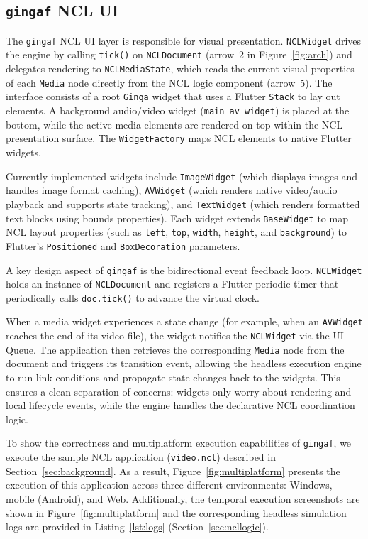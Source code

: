 \documentclass[sigconf]{webmedia}
\newcommand{\projectname}{\texttt{gingaf}}
\begin{document}
\subsection{\projectname{} NCL UI}
\label{sec:nclui2}

The \projectname{} NCL UI layer is responsible for visual presentation. \texttt{NCLWidget} drives the engine by calling \texttt{tick()} on \texttt{NCLDocument} (arrow~2 in Figure~\ref{fig:arch}) and delegates rendering to \texttt{NCLMediaState}, which reads the current visual properties of each \texttt{Media} node directly from the NCL logic component (arrow~5). The interface consists of a root \texttt{Ginga} widget that uses a Flutter \texttt{Stack} to lay out elements. A background audio/video widget (\texttt{main\_av\_widget}) is placed at the bottom, while the active media elements are rendered on top within the NCL presentation surface. The \texttt{WidgetFactory} maps NCL elements to native Flutter widgets. 

Currently implemented widgets include \texttt{ImageWidget} (which displays images and handles image format caching), \texttt{AVWidget} (which renders native video/audio playback and supports state tracking), and \texttt{TextWidget} (which renders formatted text blocks using bounds properties). Each widget extends \texttt{BaseWidget} to map NCL layout properties (such as \texttt{left}, \texttt{top}, \texttt{width}, \texttt{height}, and \texttt{background}) to Flutter's \texttt{Positioned} and \texttt{BoxDecoration} parameters.

A key design aspect of \projectname{} is the bidirectional event feedback loop. \texttt{NCLWidget} holds an instance of \texttt{NCLDocument} and registers a Flutter periodic timer that periodically calls \texttt{doc.tick()} to advance the virtual clock.

When a media widget experiences a state change (for example, when an \texttt{AVWidget} reaches the end of its video file), the widget notifies the \texttt{NCLWidget} via the UI Queue. The application then retrieves the corresponding \texttt{Media} node from the document and triggers its transition event, allowing the headless execution engine to run link conditions and propagate state changes back to the widgets. This ensures a clean separation of concerns: widgets only worry about rendering and local lifecycle events, while the engine handles the declarative NCL coordination logic.

To show the correctness and multiplatform execution capabilities of \projectname{}, we execute the sample NCL application (\texttt{video.ncl}) described in Section~\ref{sec:background}. As a result, Figure~\ref{fig:multiplatform} presents the execution of this application across three different environments: Windows, mobile (Android), and Web. Additionally, the temporal execution screenshots are shown in Figure~\ref{fig:multiplatform} and the corresponding headless simulation logs are provided in Listing~\ref{lst:logs} (Section~\ref{sec:ncllogic}).
\end{document}
